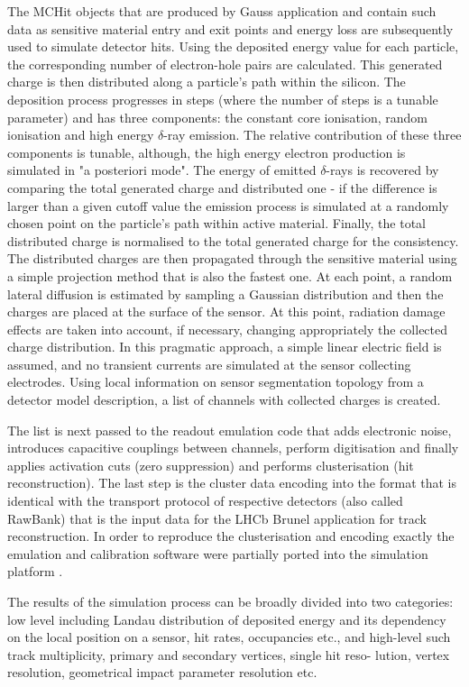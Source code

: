The MCHit objects that are produced by Gauss application and contain such data as sensitive material
entry and exit points and energy loss are subsequently used to simulate detector hits. Using the deposited
energy value for each particle, the corresponding number of electron-hole pairs are calculated. This
generated charge is then distributed along a particle’s path within the silicon. The deposition process
progresses in steps (where the number of steps is a tunable parameter) and has three components: the
constant core ionisation, random ionisation and high energy $\delta$-ray emission. The relative contribution
of these three components is tunable, although, the high energy electron production is simulated in "a
posteriori mode". The energy of emitted $\delta$-rays is recovered by comparing the total generated charge and
distributed one - if the difference is larger than a given cutoff value the emission process is simulated at a
randomly chosen point on the particle’s path within active material. Finally, the total distributed charge
is normalised to the total generated charge for the consistency.
The distributed charges are then propagated through the sensitive material using a simple projection method that is also the fastest one. At each point, a random lateral diffusion is estimated by
sampling a Gaussian distribution and then the charges are placed at the surface of the sensor. At this
point, radiation damage effects are taken into account, if necessary, changing appropriately the collected
charge distribution. In this pragmatic approach, a simple linear electric field is assumed, and no transient
currents are simulated at the sensor collecting electrodes. Using local information on sensor segmentation topology from a detector model description, a list of channels with collected charges is created.

The list is next passed to the readout emulation code that adds electronic noise, introduces capacitive
couplings between channels, perform digitisation and finally applies activation cuts (zero suppression)
and performs clusterisation (hit reconstruction). The last step is the cluster data encoding into the format
that is identical with the transport protocol of respective detectors (also called RawBank) that is the input
data for the LHCb Brunel application for track reconstruction. In order to reproduce the clusterisation
and encoding exactly the emulation and calibration software were partially ported into the simulation
platform \cite{lhcb6}.


The results of the simulation process can be broadly divided into two categories: low level including
Landau distribution of deposited energy and its dependency on the local position on a sensor, hit rates,
occupancies etc., and high-level such track multiplicity, primary and secondary vertices, single hit reso-
lution, vertex resolution, geometrical impact parameter resolution etc.

